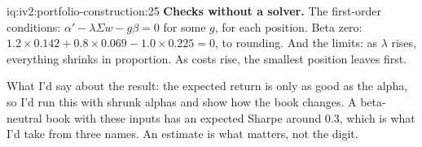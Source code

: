\begin{solution}{iq:iv2:portfolio-construction:25}
\textbf{Checks without a solver.} The first-order conditions: $\alpha' - \lambda\Sigma w - g\beta = 0$ for some $g$, for each position. Beta zero: $1.2 \times 0.142 + 0.8 \times 0.069 - 1.0 \times 0.225 = 0$, to rounding. And the limits: as $\lambda$ rises, everything shrinks in proportion. As costs rise, the smallest position leaves first.

What I'd say about the result: the expected return is only as good as the alpha, so I'd run this with shrunk alphas and show how the book changes. A beta-neutral book with these inputs has an expected Sharpe around 0.3, which is what I'd take from three names. An estimate is what matters, not the digit.

\end{solution}
